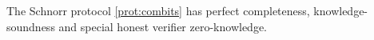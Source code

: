 \begin{thm}
The Schnorr protocol \ref{prot:combits} has perfect completeness, knowledge-soundness and special honest verifier zero-knowledge.
\end{thm}
%
%
%
%
